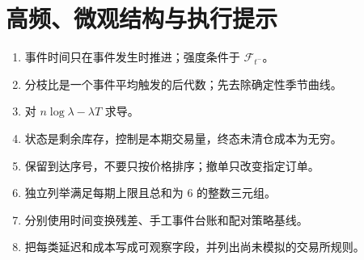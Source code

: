 \chapter{高频、微观结构与执行提示}
\begin{enumerate}[leftmargin=*]
  \item 事件时间只在事件发生时推进；强度条件于 $\mathcal F_{t^-}$。
  \item 分枝比是一个事件平均触发的后代数；先去除确定性季节曲线。
  \item 对 $n\log\lambda-\lambda T$ 求导。
  \item 状态是剩余库存，控制是本期交易量，终态未清仓成本为无穷。
  \item 保留到达序号，不要只按价格排序；撤单只改变指定订单。
  \item 独立列举满足每期上限且总和为 6 的整数三元组。
  \item 分别使用时间变换残差、手工事件台账和配对策略基线。
  \item 把每类延迟和成本写成可观察字段，并列出尚未模拟的交易所规则。
\end{enumerate}

